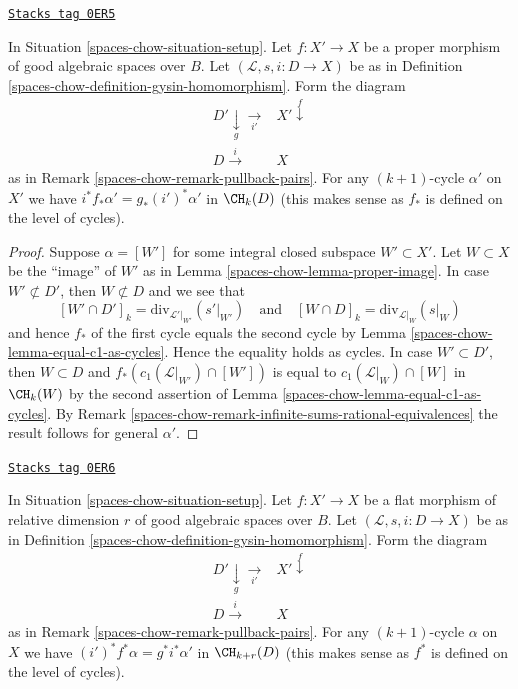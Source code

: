 \begin{lemma}
\label{spaces-chow-lemma-closed-in-X-gysin}
\href{https://stacks.math.columbia.edu/tag/0ER5}{\texttt{Stacks tag 0ER5}}

In Situation \ref{spaces-chow-situation-setup}. Let $f : X' \to X$ be a proper morphism
of good algebraic spaces over $B$. Let $(\mathcal{L}, s, i : D \to X)$ be as in
Definition \ref{spaces-chow-definition-gysin-homomorphism}.
Form the diagram
$$
\begin{array}{cc}D' \underset{g}{\downarrow}\underset{i'}{\longrightarrow} & X' \overset{f}{\downarrow} \\ D \overset{i}{\longrightarrow} & X\end{array}
$$
as in Remark \ref{spaces-chow-remark-pullback-pairs}.
For any $(k + 1)$-cycle $\alpha'$ on $X'$ we have
$i^*f_*\alpha' = g_*(i')^*\alpha'$ in $\CH_k(D)$
(this makes sense as $f_*$ is defined on the level of cycles).
\end{lemma}

\begin{proof}
Suppose $\alpha = [W']$ for some integral closed subspace
$W' \subset X'$. Let $W \subset X$ be the ``image'' of $W'$
as in Lemma \ref{spaces-chow-lemma-proper-image}. In case $W' \not \subset D'$,
then $W \not \subset D$ and we see that
$$
[W' \cap D']_k = \text{div}_{\mathcal{L}'|_{W'}}({s'|_{W'}})
\quad\text{and}\quad
[W \cap D]_k = \text{div}_{\mathcal{L}|_W}(s|_W)
$$
and hence $f_*$ of the first cycle equals the second cycle by
Lemma \ref{spaces-chow-lemma-equal-c1-as-cycles}. Hence the
equality holds as cycles. In case $W' \subset D'$, then
$W \subset D$ and $f_*(c_1(\mathcal{L}|_{W'}) \cap [W'])$
is equal to $c_1(\mathcal{L}|_W) \cap [W]$ in $\CH_k(W)$ by the second
assertion of Lemma \ref{spaces-chow-lemma-equal-c1-as-cycles}.
By Remark \ref{spaces-chow-remark-infinite-sums-rational-equivalences}
the result follows for general $\alpha'$.
\end{proof}

\begin{lemma}
\label{spaces-chow-lemma-gysin-flat-pullback}
\href{https://stacks.math.columbia.edu/tag/0ER6}{\texttt{Stacks tag 0ER6}}

In Situation \ref{spaces-chow-situation-setup}. Let $f : X' \to X$
be a flat morphism of relative dimension $r$ of
good algebraic spaces over $B$. Let $(\mathcal{L}, s, i : D \to X)$ be as in
Definition \ref{spaces-chow-definition-gysin-homomorphism}. Form the diagram
$$
\begin{array}{cc}D' \underset{g}{\downarrow}\underset{i'}{\longrightarrow} & X' \overset{f}{\downarrow} \\ D \overset{i}{\longrightarrow} & X\end{array}
$$
as in Remark \ref{spaces-chow-remark-pullback-pairs}.
For any $(k + 1)$-cycle $\alpha$ on $X$ we have
$(i')^*f^*\alpha = g^*i^*\alpha'$ in $\CH_{k + r}(D)$
(this makes sense as $f^*$ is defined on the level of cycles).
\end{lemma}

